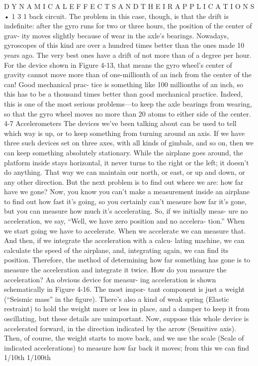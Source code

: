\documentclass[10pt,oneside]{article}
\begin{document}
D Y N A M I C A L  E F F E C T S  A N D  T H E I R  A P P L I C A T I O N S • 1 3 1 back circuit. The problem in this case, though, is that the drift is indefinite: after the gyro runs for two or three hours, the position of the center of grav- ity moves slightly because of wear in the axle’s bearings. Nowadays, gyroscopes of this kind are over a hundred times better than the ones made 10 years ago. The very best ones have a drift of not more than of a degree per hour. For the device shown in Figure 4-13, that means the gyro wheel’s center of gravity cannot move more than of one-millionth of an inch from the center of the can! Good mechanical prac- tice is something like 100 millionths of an inch, so this has to be a thousand times better than good mechanical practice. Indeed, this is one of the most serious problems---to keep the axle bearings from wearing, so that the gyro wheel moves no more than 20 atoms to either side of the center. 4-7 Accelerometers The devices we’ve been talking about can be used to tell which way is up, or to keep something from turning around an axis. If we have three such devices set on three axes, with all kinds of gimbals, and so on, then we can keep something absolutely stationary. While the airplane goes around, the platform inside stays horizontal, it never turns to the right or the left; it doesn’t do anything. That way we can maintain our north, or east, or up and down, or any other direction. But the next problem is to find out where we are: how far have we gone? Now, you know you can’t make a measurement inside an airplane to find out how fast it’s going, so you certainly can’t measure how far it’s gone, but you can measure how much it’s accelerating. So, if we initially meas- ure no acceleration, we say, “Well, we have zero position and no accelera- tion.” When we start going we have to accelerate. When we accelerate we can measure that. And then, if we integrate the acceleration with a calcu- lating machine, we can calculate the speed of the airplane, and, integrating again, we can find its position. Therefore, the method of determining how far something has gone is to measure the acceleration and integrate it twice. How do you measure the acceleration? An obvious device for measur- ing acceleration is shown schematically in Figure 4-16. The most impor- tant component is just a weight (“Seismic mass” in the figure). There’s also a kind of weak spring (Elastic restraint) to hold the weight more or less in place, and a damper to keep it from oscillating, but these details are unimportant. Now, suppose this whole device is accelerated forward, in the direction indicated by the arrow (Sensitive axis). Then, of course, the weight starts to move back, and we use the scale (Scale of indicated accelerations) to measure how far back it moves; from this we can find 1/10th 1/100th\par
\end{document}
